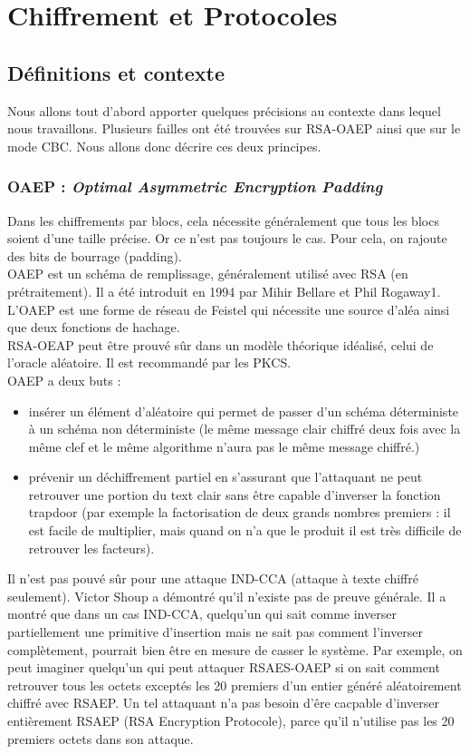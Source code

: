 \chapter{Chiffrement et Protocoles}

\section{Définitions et contexte}

Nous allons tout d'abord apporter quelques précisions au contexte dans lequel nous travaillons. Plusieurs failles ont été trouvées sur RSA-OAEP ainsi que sur le mode CBC. Nous allons donc décrire ces deux principes.
\subsection{OAEP : \textit{Optimal Asymmetric Encryption Padding}}
Dans les chiffrements par blocs, cela nécessite généralement que tous les blocs soient d'une taille précise. Or ce n'est pas toujours le cas. Pour cela, on rajoute des bits de bourrage (padding).\\
OAEP est un schéma de remplissage, généralement utilisé avec RSA (en prétraitement). Il a été introduit en 1994 par Mihir Bellare et Phil Rogaway1. L'OAEP est une forme de réseau de Feistel qui nécessite une source d'aléa ainsi que deux fonctions de hachage.\\
RSA-OEAP peut être prouvé sûr dans un modèle théorique idéalisé, celui de l'oracle aléatoire. Il est recommandé par les PKCS.\\
OAEP a deux buts :
\begin{itemize}
\item insérer un élément d'aléatoire qui permet de passer d'un schéma déterministe à un schéma non déterministe (le même message clair chiffré deux fois avec la même clef et le même algorithme n'aura pas le même message chiffré.)
\item prévenir un déchiffrement partiel en s'assurant que l'attaquant ne peut retrouver une portion du text clair sans être capable d'inverser la fonction trapdoor (par exemple la factorisation de deux grands nombres premiers : il est facile de multiplier, mais quand on n'a que le produit il est très difficile de retrouver les facteurs).\\
\end{itemize}
Il n'est pas pouvé sûr pour une attaque IND-CCA (attaque à texte chiffré seulement). Victor Shoup a démontré qu'il n'existe pas de preuve générale.
Il a montré que dans un cas IND-CCA, quelqu'un qui sait comme inverser partiellement une primitive d'insertion mais ne sait pas comment l'inverser complètement, pourrait bien être en mesure de casser le système. Par exemple, on peut imaginer quelqu'un qui peut attaquer RSAES-OAEP si on sait comment retrouver tous les octets exceptés les 20 premiers d'un entier généré aléatoirement chiffré avec RSAEP. Un tel attaquant n'a pas besoin d'êre cacpable d'inverser entièrement RSAEP (RSA Encryption Protocole), parce qu'il n'utilise pas les 20 premiers octets dans son attaque.

